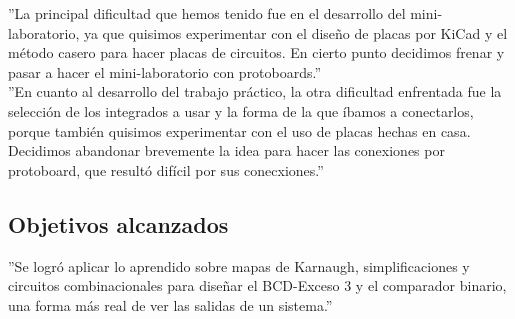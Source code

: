 ''La principal dificultad que hemos tenido fue en el desarrollo del mini-laboratorio, ya que quisimos experimentar con el diseño de placas por KiCad y el método casero para hacer placas de circuitos. En cierto punto decidimos frenar y pasar a hacer el mini-laboratorio con protoboards.'' \\
\sangria{}''En cuanto al desarrollo del trabajo práctico, la otra dificultad enfrentada fue la selección de los integrados a usar y la forma de la que íbamos a conectarlos, porque también quisimos experimentar con el uso de placas hechas en casa. Decidimos abandonar brevemente la idea para hacer las conexiones por protoboard, que resultó difícil por sus conecxiones.''

\subsection{Objetivos alcanzados}

''Se logró aplicar lo aprendido sobre mapas de Karnaugh, simplificaciones y circuitos combinacionales para diseñar el BCD-Exceso 3 y el comparador binario, una forma más real de ver las salidas de un sistema.''


